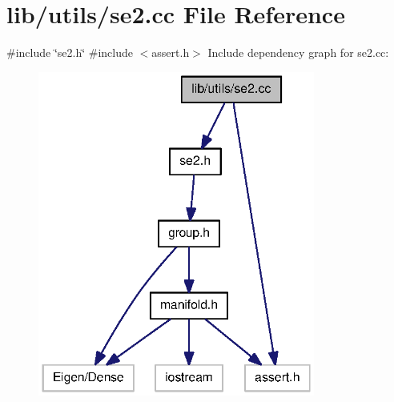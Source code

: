 \section{lib/utils/se2.cc \-File \-Reference}
\label{se2_8cc}
{\ttfamily \#include \char`\"{}se2.\-h\char`\"{}}\*
{\ttfamily \#include $<$assert.\-h$>$}\*
\-Include dependency graph for se2.\-cc\-:\nopagebreak
\begin{figure}[H]
\begin{center}
\leavevmode
\includegraphics[width=258pt]{se2_8cc__incl}
\end{center}
\end{figure}
